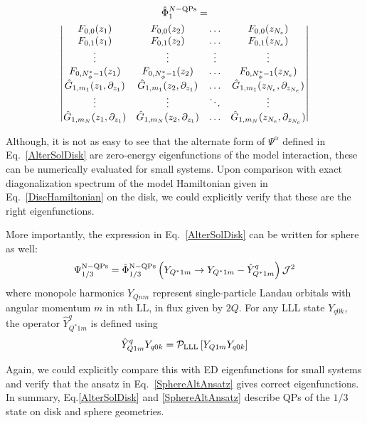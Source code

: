 \documentclass[prb,aps,epsfig,longbibliography,twocolumn]{revtex4-1}
\newcommand{\rbkt}[1]{\left( #1\right)}
\newcommand{\sbkt}[1]{\left[ #1\right]}
\newcommand{\np}{N_{\phi}}
\begin{document}
\begin{multline}\label{deterPhiAlpha}
\hat\Phi^{ N\rm-QPs}_{1}=\\ \left\vert \begin{matrix}
F_{0,0}(z_1)  & F_{0,0}(z_2) & \dots & F_{0,0}(z_{N_e}) \\
F_{0,1}(z_1)  & F_{0,1}(z_2) & \dots & F_{0,1}(z_{N_e}) \\
\vdots & \vdots & \vdots & \vdots \\ 
F_{0,\np^*-1}(z_1)  & F_{0,\np^*-1}(z_2) & \dots & F_{0,\np^*-1}(z_{N_e}) \\
\hat{G}_{1,m_{1}}(z_1,\partial_{z_1})  & \hat{G}_{1,m_{1}}(z_2,\partial_{z_1}) & \dots & \hat{G}_{1,m_{1}}(z_{N_e},\partial_{z_{N_e}})\\
\vdots & \vdots & \ddots & \vdots \\ 
\hat{G}_{1,m_{N}}(z_1,\partial_{z_1})  & \hat{G}_{1,m_{N}}(z_2,\partial_{z_1}) & \dots & \hat{G}_{1,m_{N}}(z_{N_e},\partial_{z_{N_e}})
\end{matrix}
\right\vert
\end{multline}

Although, it is not as easy to see that the alternate form of $\Psi^{\alpha}$ defined in Eq.~\eqref{AlterSolDisk} are zero-energy eigenfunctions of the model interaction, these can be numerically evaluated for small systems. Upon comparison with exact diagonalization spectrum of the model Hamiltonian given in Eq.~\eqref{DiscHamiltonian} on the disk, we could explicitly verify that these are the right eigenfunctions.

More importantly, the expression in  Eq.~\eqref{AlterSolDisk} can be written for sphere as well:
\begin{equation}
	\Psi^{\rm N-QPs}_{1/3} = \hat{\Phi}^{\rm N-QPs}_{1/3}\rbkt{Y_{Q^*1m}\rightarrow Y_{Q^*1m}-\hat{Y}^{q}_{Q^*1m}} \mathcal{J}^{2} \label{SphereAltAnsatz}
\end{equation}
where monopole harmonics $Y_{Qnm}$ represent single-particle Landau orbitals with angular momentum $m$ in $n$th LL, in flux given by $2Q$. For any LLL state $Y_{q0k}$, the operator $\hat{Y}^{q}_{Q^*1m}$ is defined using
\begin{equation}
\hat{Y}^{q}_{Q1m}  Y_{q0k}= \mathcal{P}_{\rm LLL} \sbkt{ Y_{Q1m} Y_{q0k}}
\end{equation}

Again, we could explicitly compare this with ED eigenfunctions for small systems and verify that the ansatz in Eq.~\eqref{SphereAltAnsatz} gives correct eigenfunctions. In summary, Eq.\eqref{AlterSolDisk} and \eqref{SphereAltAnsatz} describe QPs of the $1/3$ state on disk and sphere geometries.
\end{document}
